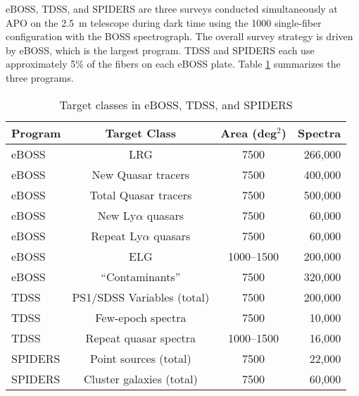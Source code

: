 eBOSS, TDSS, and SPIDERS are three surveys conducted simultaneously at
APO on the 2.5~m telescope during dark time using the 1000
single-fiber configuration with the BOSS spectrograph. The overall
survey strategy is driven by eBOSS, which is the largest program. TDSS
and SPIDERS each use approximately 5\% of the fibers on each eBOSS
plate.  Table \ref{table:eboss_tdss_spiders} summarizes the three
programs.

\begin{table}[htp]
\caption{
\label{table:eboss_tdss_spiders} Target classes in eBOSS, TDSS,
and SPIDERS }
\begin{tabular}{lccr}
\hline\hline
Program & Target Class & Area (deg$^2$) & Spectra \\
\hline
eBOSS & LRG & 7500 & 266,000 \\
eBOSS & New Quasar tracers & 7500 & 400,000 \\
eBOSS & Total Quasar tracers & 7500 & 500,000 \\
eBOSS & New Ly$\alpha$ quasars & 7500 & 60,000 \\
eBOSS & Repeat Ly$\alpha$ quasars & 7500 & 60,000 \\
eBOSS & ELG & 1000--1500 & 200,000 \\
eBOSS & ``Contaminants''\tablenotemark{a} & 7500 & 320,000 \\ 
TDSS & PS1/SDSS Variables (total) & 7500 & 200,000 \\
TDSS & Few-epoch spectra & 7500 & 10,000 \\
TDSS & Repeat quasar spectra & 1000--1500 & 16,000 \\
SPIDERS & Point sources (total) & 7500 & 22,000 \\
SPIDERS & Cluster galaxies (total) & 7500 & 60,000 \\
\hline
\end{tabular}
\end{table}
